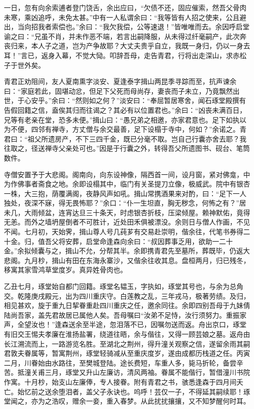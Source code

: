 \documentclass[]{article}
\begin{document}
一日，忽有向余索逋者登门饶舌，余出应曰，``欠债不还，固应催索，然吾父骨肉未寒，乘凶追呼，未免太甚。''中有一人私谓余曰：``我等皆有人招之使来，公且避出，当向招我者索偿也。''余曰：``我欠我偿，公等速退！''皆唯唯而去。余因呼启堂谕之曰：``兄虽不肖，并未作恶不端，若言出嗣降服，从未得过纤毫嗣产，此次奔丧归来，本人子之道，岂为产争故耶？大丈夫贵乎自立，我既一身归，仍以一身去耳！''言已，返身入幕，不觉大恸。叩辞吾母，走告青君，行将出走深山，求赤松子于世外矣。

青君正劝阻间，友人夏南熏字淡安、夏逢泰字揖山两昆季寻踪而至，抗声谏余曰：``家庭若此，固堪动忿，但足下父死而母尚存，妻丧而子未立，乃竟飘然出世，于心安乎。''余曰：``然则如之何？''淡安曰：``奉屈暂居寒舍，闻石琢堂殿撰有告假回籍之信，盍俟其归而往谒之？其必有以位置君也。''余曰：``凶丧未满百日，兄等有老亲在堂，恐多未便。''揖山曰：``愚兄弟之相邀，亦家君意也。足下如执以为不便，四邻有禅寺，方丈僧与余交最善，足下设榻于寺中，何如？''余诺之。青君曰：``祖父所遗房产，不下三四千金，既已分毫不取。岂自己行囊亦舍去耶？我往取之，径送禅寺父亲处可也。''因是于行囊之外，转得吾父所遗图书、砚台、笔筒数件。

寺僧安置予于大悲阁。阁南向，向东设神像，隔西首一间，设月窗，紧对佛龛，中为作佛事者斋食之地。余即设榻其中，临门有关圣提刀立像，极威武。院中有银杏一株，大三抱，荫覆满阁，夜静风声如吼。揖山常携酒果来对酌，曰：``足下一人独处，夜深不寐，得无畏怖耶？''余口：``仆一生坦直，胸无秽念，何怖之有？''居未几，大雨倾盆，连宵达旦三十条天，时虑银杏折枝，压梁倾屋。赖神默佑，竟得无恙。而外之墙坍屋倒者不可胜计，近处田禾俱被漂没。余则日与僧人作画，不见不闻。七月初，天始霁，揖山尊人号几莼芗有交易赴崇明，偕余往，代笔书券得二十金。归，值吾父将安葬，启堂命逢森向余曰：``叔因葬事乏用，欲助一二十金。''余拟倾囊与之，揖山不允，分帮其半。余即携青君先至墓所，葬既毕，仍返大悲阁。九月杪，揖山有田在东海永寨沙，又偕余往收其息。盘桓两月，归已残冬，移寓其家雪鸿草堂度岁。真异姓骨肉也。

乙丑七月，琢堂始自都门回籍。琢堂名韫玉，字执如，琢堂其号也，与余为总角交。乾隆庚戌殿元，出为四川重庆守。白莲教之乱，三年戎马，极著劳绩。及归，相见甚欢，旋于重九日挈眷重赴四川重庆之任，邀余同往。余即四别吾母于九妹倩陆尚吾家，盖先君故居已属他人矣。吾母嘱曰``汝弟不足恃，汝行须努力。重振家声，全望汝也！''逢森送余至半途，忽泪落不已，因嘱勿送而返。舟出京口，琢堂有旧交王惕夫孝廉在淮扬盐署，绕道往晤，余与偕往，又得一顾芸娘之墓。返舟由长江溯流而上，一路游览名胜。至湖北之荆州，得升潼关观察之信，遂留余雨其嗣君敦夫眷属等，暂寓荆州，琢堂轻骑减从至重庆度岁，遂由成都历栈道之任。丙寅二月，川眷始由水路往，至樊城登陆。途长费短，车重人多，毙马折轮，备尝辛苦。抵潼关甫三月，琢堂又升山左廉访，清风两袖。眷属不能偕行，暂借潼川书院作寓。十月杪，始支山左廉俸，专人接眷。附有青君之书，骇悉逢森于四月间夭亡。始忆前之送余堕泪者，盖父子永诀也。呜呼！芸仅一子，不得延其嗣续耶！琢堂闻之，亦为之浩叹，赠余一妾，重入春梦。从此扰扰攘攘，又不知梦醒何时耳。
\end{document}

